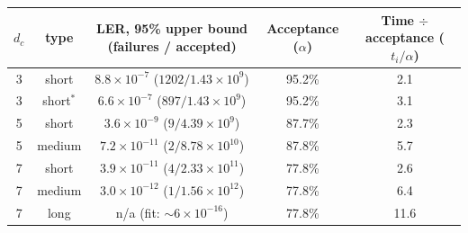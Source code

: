 \begin{tabular}{ccccc}
\toprule
$d_c$ & type & LER, 95\% upper bound (failures / accepted) & Acceptance ($\alpha$) & Time $\div$ acceptance ($t_i/\alpha$) \\
\midrule
3 & short & $8.8\times10^{-7}$ \; ($1202 / 1.43\times10^{9}$) & 95.2\% & 2.1 \\
3 & short$^*$ & $6.6\times10^{-7}$ \; ($897 / 1.43\times10^{9}$) & 95.2\% & 3.1 \\
5 & short & $3.6\times10^{-9}$ \; ($9 / 4.39\times10^{9}$) & 87.7\% & 2.3 \\
5 & medium & $7.2\times10^{-11}$ \; ($2 / 8.78\times10^{10}$) & 87.8\% & 5.7 \\
7 & short & $3.9\times10^{-11}$ \; ($4 / 2.33\times10^{11}$) & 77.8\% & 2.6 \\
7 & medium & $3.0\times10^{-12}$ \; ($1 / 1.56\times10^{12}$) & 77.8\% & 6.4 \\
7 & long & n/a \; (fit: ${\sim}6\times10^{-16}$) & 77.8\% & 11.6 \\
\bottomrule
\end{tabular}
